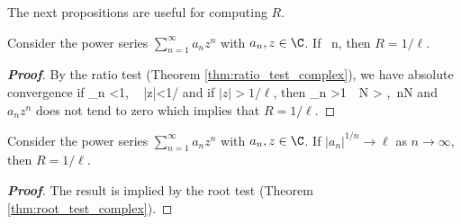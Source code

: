 %
%


The next propositions are useful for computing $R$.

\begin{proposition}\label{pro:ratio_test_convergence_radius}%
Consider the power series $\sum^\infty_{n=1}a_n z^n$ with $a_n,z\in \C$. If
\be
{}\to \ell \ n\to \infty,
\ee
then $R=1/\ell$.
\end{proposition}

\begin{proof}[{\bf Proof}]
By the ratio test (Theorem \ref{thm:ratio_test_complex}), we have absolute convergence if
\be
\lim_{n\to \infty} <1, \  |z|<1/\ell
\ee
and if $|z|>1/\ell$, then
\be
\lim_{n\to \infty} >1\ \ra\ \exists N > ,\ \forall n\geq N
\ee
and $a_nz^n$ does not tend to zero which implies that $R=1/\ell$.
\end{proof}

\begin{proposition}\label{pro:root_test_convergence_radius}
Consider the power series $\sum^\infty_{n=1}a_n z^n$ with $a_n,z\in \C$. If $|a_n|^{1/n}\to \ell$ as $n\to \infty$, then $R=1/\ell$.
\end{proposition}


\begin{proof}[\bf Proof]
The result is implied by the root test (Theorem \ref{thm:root_test_complex}). %
\end{proof}

